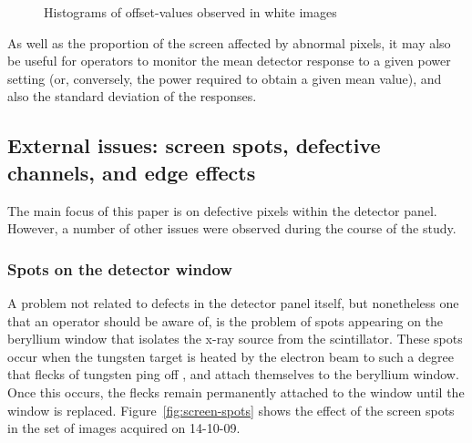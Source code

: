 \documentclass[\main/IO-Pixels.tex]{subfiles}
\begin{document}
\begin{figure}
    \caption{Histograms of offset-values observed in white images}
    

\end{figure}

As well as the proportion of the screen affected by abnormal pixels, it may also be useful for operators to monitor the mean detector response to a given power setting (or, conversely, the power required to obtain a given mean value), and also the standard deviation of the responses. 

\subsection{External issues: screen spots, defective channels, and edge effects}
The main focus of this paper is on defective pixels within the detector panel. However, a number of other issues were observed during the course of the study.

\subsubsection{Spots on the detector window}
\label{sec:screen-spots}

A problem not related to defects in the detector panel itself, but nonetheless one that an operator should be aware of, is the problem of spots appearing on the beryllium window that isolates the x-ray source from the scintillator. These spots occur when the tungsten target is heated by the electron beam to such a degree that flecks of tungsten ping off , and attach themselves to the beryllium window. Once this occurs, the flecks remain permanently attached to the window until the window is replaced. Figure~\ref{fig:screen-spots} shows the effect of the screen spots in the set of images acquired on 14-10-09.
\end{document}

